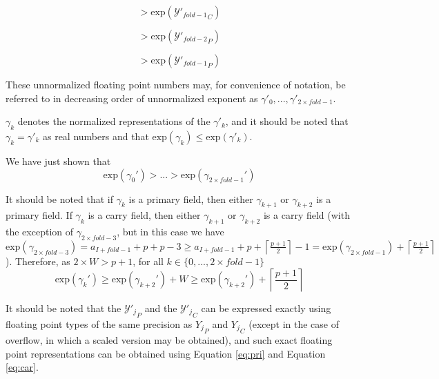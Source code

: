\documentclass[12pt]{article}
\providecommand{\ceil}[1]{\left \lceil #1 \right \rceil }
\providecommand{\exp}{\ensuremath{\text{exp}}}
\theoremstyle{definition}
\numberwithin{equation}{section}
\begin{document}
    \begin{equation*}
    > \exp({\mathcal{Y}'_{fold - 1}}_C)
    \end{equation*}

    \begin{equation*}
    > \exp({\mathcal{Y}'_{fold - 2}}_P)
    \end{equation*}

    \begin{equation*}
    > \exp({\mathcal{Y}'_{fold - 1}}_P)
    \end{equation*}

    These unnormalized floating point numbers may, for convenience of notation, be referred to in decreasing order of unnormalized exponent as $\gamma'_0, ..., \gamma'_{2 \times fold - 1}$.

    $\gamma_k$ denotes the normalized representations of the $\gamma'_k$, and it should be noted that $\gamma_k = \gamma'_k$ as real numbers and that $\exp(\gamma_k) \leq \exp(\gamma'_k)$.

    We have just shown that
    \begin{equation}
      \exp(\gamma_0') > ... > \exp(\gamma_{2 \times fold - 1}')
      \label{eq:gammadecreases}
    \end{equation}

    It should be noted that if $\gamma_k$ is a primary field, then either $\gamma_{k + 1}$ or $\gamma_{k + 2}$ is a primary field. If $\gamma_k$ is a carry field, then either $\gamma_{k + 1}$ or $\gamma_{k + 2}$ is a carry field (with the exception of $\gamma_{2 \times fold - 3}$, but in this case we have $\exp(\gamma_{2 \times fold - 3}) = a_{I + fold - 1} + p + p - 3 \geq a_{I + fold - 1} + p + \ceil{\frac{p + 1}{2}} - 1 = \exp(\gamma_{2 \times fold - 1}) + \ceil{\frac{p + 1}{2}}$). Therefore, as $2 \times W > p + 1$, for all $k \in \{0, ..., 2 \times fold - 1\}$
    \begin{equation}
      \exp(\gamma_k') \geq \exp(\gamma_{k + 2}') + W \geq \exp(\gamma_{k + 2}') + \ceil{\frac{p + 1}{2}}
      \label{eq:gammadecreasesfast}
    \end{equation}

    It should be noted that the ${\mathcal{Y}'_j}_P$ and the ${\mathcal{Y}'_j}_C$ can be expressed exactly using floating point types of the same precision as ${Y_j}_P$ and ${Y_j}_C$ (except in the case of overflow, in which a scaled version may be obtained), and such exact floating point representations can be obtained using Equation \ref{eq:pri} and Equation \ref{eq:car}.
\end{document}
